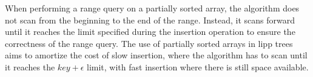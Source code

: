 When performing a range query on a partially sorted array, the algorithm does not scan from the beginning to the end of the range. Instead, it scans forward until it reaches the limit specified during the insertion operation to ensure the correctness of the range query. The use of partially sorted arrays in \acrshort{lipp} trees aims to amortize the cost of slow insertion, where the algorithm has to scan until it reaches the $key+\epsilon$ limit, with fast insertion where there is still space available.











